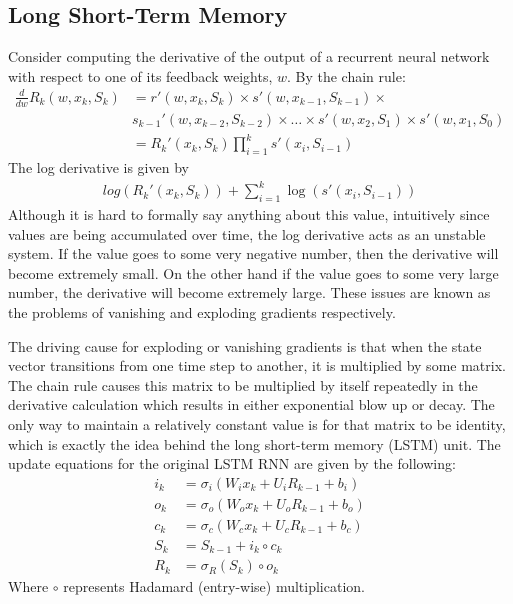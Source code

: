 \subsection{Long Short-Term Memory}
Consider computing the derivative of the output of a recurrent neural network with respect to one of its feedback weights, $w$.  By the chain rule:
\begin{align}\label{eq:rnn_deriv}
\frac{d}{dw}R_k(w,x_k,S_k) &= r'(w,x_k,S_k)\times s'(w,x_{k-1},S_{k-1})\times \nonumber
\\&s_{k-1}'(w,x_{k-2},S_{k-2})\times \dots
\times s'(w,x_2,S_1)\times s'(w,x_1,S_0)\\
&= R_k'(x_k,S_k)\prod_{i=1}^k s'(x_i,S_{i-1})
\end{align}
The log derivative is given by
\begin{align}
log(R_k'(x_k,S_k)) + \sum_{i=1}^k \log(s'(x_i,S_{i-1}))
\end{align}
Although it is hard to formally say anything about this value, intuitively since values are being accumulated over time, the log derivative acts as an unstable system.  If the value goes to some very negative number, then the derivative will become extremely small.  On the other hand if the value goes to some very large number, the derivative will become extremely large.  These issues are known as the problems of vanishing and exploding gradients respectively.

The driving cause for exploding or vanishing gradients is that when the state vector transitions from one time step to another, it is multiplied by some matrix.  The chain rule causes this matrix to be multiplied by itself repeatedly in the derivative calculation which results in either exponential blow up or decay.  The only way to maintain a relatively constant value is for that matrix to be identity, which is exactly the idea behind the long short-term memory (LSTM) unit. \cite{sh97} The update equations for the original LSTM RNN are given by the following:
\begin{align}\label{eq:lstm_start}
i_k &= \sigma_i(W_ix_k + U_iR_{k-1} + b_i)\\
o_k &= \sigma_o(W_ox_k + U_oR_{k-1} + b_o)\\
c_k &= \sigma_c(W_cx_k + U_cR_{k-1} + b_c)\\
S_k &= S_{k-1} + i_k \circ c_k\\
R_k &= \sigma_R(S_k) \circ o_k\label{eq:lstm_end}
\end{align}
Where $\circ$ represents Hadamard (entry-wise) multiplication.

